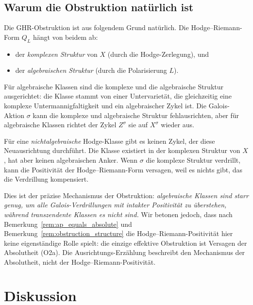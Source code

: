 \documentclass[aps,prd,twocolumn,superscriptaddress,nofootinbib]{revtex4-2}
\theoremstyle{definition}
\theoremstyle{remark}
\begin{document}
\subsection{Warum die Obstruktion natürlich ist}

Die GHR-Obstruktion ist aus folgendem Grund natürlich. Die Hodge--Riemann-Form $Q_L$ hängt von beidem ab:
\begin{itemize}
\item der \textit{komplexen Struktur} von $X$ (durch die Hodge-Zerlegung), und
\item der \textit{algebraischen Struktur} (durch die Polarisierung $L$).
\end{itemize}

Für algebraische Klassen sind die komplexe und die algebraische Struktur \glqq ausgerichtet\grqq{}: die Klasse stammt von einer Untervarietät, die gleichzeitig eine komplexe Untermannigfaltigkeit und ein algebraischer Zykel ist. Die Galois-Aktion $\sigma$ kann die komplexe und algebraische Struktur \glqq fehlausrichten\grqq{}, aber für algebraische Klassen \glqq richtet\grqq{} der Zykel $Z^\sigma$ sie auf $X^\sigma$ wieder aus.

Für eine \textit{nichtalgebraische} Hodge-Klasse gibt es keinen Zykel, der diese Neuausrichtung durchführt. Die Klasse existiert in der komplexen Struktur von $X$, hat aber keinen algebraischen Anker. Wenn $\sigma$ die komplexe Struktur verdrillt, kann die Positivität der Hodge--Riemann-Form versagen, weil es nichts gibt, das die Verdrillung kompensiert.

Dies ist der präzise Mechanismus der Obstruktion: \textit{algebraische Klassen sind starr genug, um alle Galois-Verdrillungen mit intakter Positivität zu überstehen, während transzendente Klassen es nicht sind.} Wir betonen jedoch, dass nach Bemerkung~\ref{rem:ap_equals_absolute} und Bemerkung~\ref{rem:obstruction_structure} die Hodge--Riemann-Positivität hier keine eigenständige Rolle spielt: die einzige effektive Obstruktion ist Versagen der Absolutheit (O2a). Die \glqq Ausrichtungs\grqq{}-Erzählung beschreibt den Mechanismus der Absolutheit, nicht der Hodge--Riemann-Positivität.


\section{Diskussion}
\label{sec:discussion}
\end{document}
